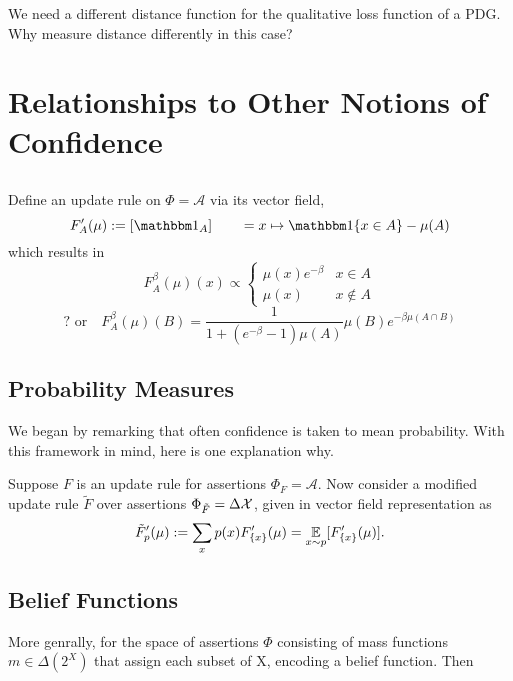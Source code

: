 \documentclass{article}
\begin{document}
%

We need a different distance function for the qualitative loss function of a PDG.
Why measure distance differently in this case?


\section{Relationships to Other Notions of Confidence}

\subsection{}

Define an update rule on $\Phi = \mathcal A$ via its vector field,
\[
    F'_A(\mu) := [ \mathbbm 1_{A} ]
     \qquad = x \mapsto \mathbbm1\{x \in A\} - \mu(A)
\]
which results in
\[
    F_A^\beta(\mu)(x) \propto
    \begin{cases}
        \mu(x) e^{-\beta} & x \in A \\
        \mu(x) & x \notin A
    \end{cases}
\]
\[\text{? or}\quad
    F_A^\beta(\mu) (B) =
    \frac{1}{1 + (e^{-\beta}-1) \mu(A) } \mu(B) e^{-\beta \mu(A \cap B)}
\]

\subsection{Probability Measures}

We began by remarking that often confidence is taken to mean probability.
With this framework in mind, here is one explanation why.

Suppose $F$ is an update rule for assertions $\Phi_F = \mathcal A$.
Now consider a modified update rule $\tilde F$ over assertions $\Phi_{\tilde F} = \Delta\mathcal X$, given in vector field representation as
\[
    \tilde F'_p(\mu) := \sum_{x} p(x) F'_{\{x\}}(\mu)
    = \operatorname*{\mathbb{E}}_{x \sim p} [ F'_{\{x\}} (\mu) ].
\]

\subsection{Belief Functions}
More genrally, for the space of assertions $\Phi$ consisting of mass functions $m \in \Delta(2^X)$ that assign each subset of X, encoding a belief function. Then
\end{document}
